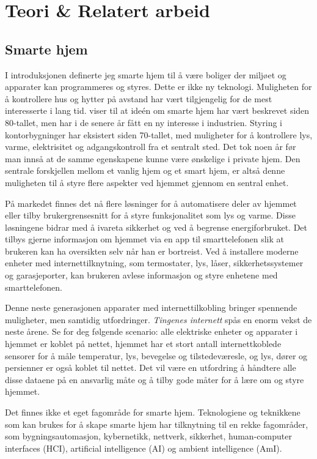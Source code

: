 \section[Teori \& Relatert arbeid]{Teori \& Relatert arbeid}
\subsection{Smarte hjem}
\label{ch:smartehjem}
I introduksjonen definerte jeg smarte hjem til å være boliger der miljøet og apparater kan programmeres og styres. Dette er ikke ny teknologi. Muligheten for å kontrollere hus og hytter på avstand har vært tilgjengelig for de mest interesserte i lang tid. \citet{peine08} viser til at ideén om smarte hjem har vært beskrevet siden 80-tallet, men har i de senere år fått en ny interesse i industrien. Styring i kontorbygninger har eksistert siden 70-tallet, med muligheter for å kontrollere lys, varme, elektrisitet og adgangskontroll fra et sentralt sted. Det tok noen år før man innså at de samme egenskapene kunne være ønskelige i private hjem. Den sentrale forskjellen mellom et vanlig hjem og et smart hjem, er altså denne muligheten til å styre flere aspekter ved hjemmet gjennom en sentral enhet.

På markedet finnes det nå flere løsninger for å automatisere deler av hjemmet eller tilby brukergrensesnitt for å styre funksjonalitet som lys og varme. Disse løsningene bidrar med å ivareta sikkerhet og ved å begrense energiforbruket. Det tilbys gjerne informasjon om hjemmet via en app til smarttelefonen slik at brukeren kan ha oversikten selv når han er bortreist. Ved å installere moderne enheter med internettilknytning, som termostater, lys, låser, sikkerhetssystemer og garasjeporter, kan brukeren avlese informasjon og styre enhetene med smarttelefonen.

Denne neste generasjonen apparater med internettilkobling bringer spennende muligheter, men samtidig utfordringer. \emph{Tingenes internett} spås en enorm vekst de neste årene. Se for deg følgende scenario: alle elektriske enheter og apparater i hjemmet er koblet på nettet, hjemmet har et stort antall internettkoblede sensorer for å måle temperatur, lys, bevegelse og tilstedeværesle, og lys, dører og persienner er også koblet til nettet. Det vil være en utfordring å håndtere alle disse dataene på en ansvarlig måte og å tilby gode måter for å lære om og styre hjemmet.

Det finnes ikke et eget fagområde for smarte hjem. Teknologiene og teknikkene som kan brukes for å skape smarte hjem har tilknytning til en rekke fagområder, som bygningsautomasjon, kybernetikk, nettverk, sikkerhet, human-computer interfaces (HCI), artificial intelligence (AI) og ambient intelligence (AmI).

